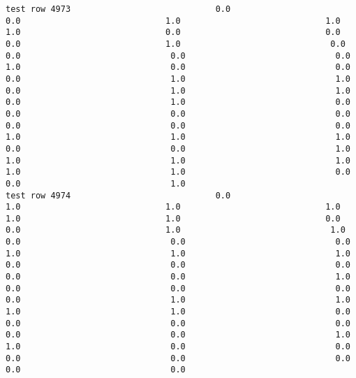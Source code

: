 \documentclass[11pt]{article}
\begin{document}
\begin{verbatim}
test row 4973                             0.0                             0.0                             1.0                             1.0                             1.0                             0.0                             0.0                             0.0                             1.0                              0.0                              0.0                              0.0                              0.0                              1.0                              0.0                              0.0                              0.0                              1.0                              1.0                              0.0                              1.0                              1.0                              0.0                              1.0                              0.0                              0.0                              0.0                              0.0                              0.0                              0.0                              0.0                              1.0                              1.0                              1.0                              0.0                              0.0                              1.0                              1.0                              1.0                              1.0                              1.0                              1.0                              0.0                              0.0                              1.0
test row 4974                             0.0                             1.0                             1.0                             1.0                             1.0                             1.0                             0.0                             0.0                             1.0                              1.0                              0.0                              0.0                              0.0                              1.0                              1.0                              1.0                              0.0                              0.0                              0.0                              0.0                              0.0                              1.0                              0.0                              0.0                              0.0                              0.0                              1.0                              1.0                              1.0                              1.0                              0.0                              0.0                              0.0                              0.0                              0.0                              0.0                              1.0                              1.0                              0.0                              0.0                              0.0                              0.0                              0.0                              0.0                              0.0

\end{verbatim}
\end{document}
